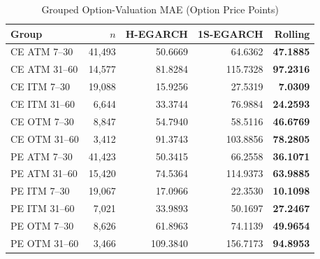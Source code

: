\documentclass[journal]{IEEEtran}
\begin{document}
\begin{table}[!t]
\renewcommand{\arraystretch}{1.12}
\caption{Grouped Option-Valuation MAE (Option Price Points)}
\label{tab:valuation_mae}
\centering
\scriptsize
\begin{tabular}{lrrrr}
\toprule
\textbf{Group} & $n$ & \textbf{H-EGARCH} & \textbf{1S-EGARCH} & \textbf{Rolling} \\
\midrule
CE ATM 7--30 & 41{,}493 & 50.6669 & 64.6362 & \textbf{47.1885} \\
CE ATM 31--60 & 14{,}577 & 81.8284 & 115.7328 & \textbf{97.2316} \\
CE ITM 7--30 & 19{,}088 & 15.9256 & 27.5319 & \textbf{7.0309} \\
CE ITM 31--60 & 6{,}644 & 33.3744 & 76.9884 & \textbf{24.2593} \\
CE OTM 7--30 & 8{,}847 & 54.7940 & 58.5116 & \textbf{46.6769} \\
CE OTM 31--60 & 3{,}412 & 91.3743 & 103.8856 & \textbf{78.2805} \\
PE ATM 7--30 & 41{,}423 & 50.3415 & 66.2558 & \textbf{36.1071} \\
PE ATM 31--60 & 15{,}420 & 74.5364 & 114.9373 & \textbf{63.9885} \\
PE ITM 7--30 & 19{,}067 & 17.0966 & 22.3530 & \textbf{10.1098} \\
PE ITM 31--60 & 7{,}021 & 33.9893 & 50.1697 & \textbf{27.2467} \\
PE OTM 7--30 & 8{,}626 & 61.8963 & 74.1139 & \textbf{49.9654} \\
PE OTM 31--60 & 3{,}466 & 109.3840 & 156.7173 & \textbf{94.8953} \\
\bottomrule
\end{tabular}
\end{table}
\end{document}
